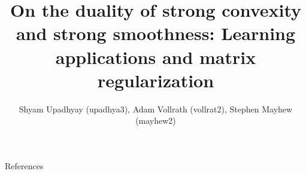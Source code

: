 \documentclass[11pt]{beamer}
\author{Shyam Upadhyay (upadhya3), Adam Vollrath (vollrat2), Stephen Mayhew (mayhew2)}
\title{On the duality of strong convexity and strong smoothness: Learning applications and matrix regularization}
\begin{document}
{\nologo
\begin{frame}
\titlepage
\end{frame}
}








\begin{frame}[allowframebreaks]{References}
  \def\newblock{}
  
  
\end{frame}
\end{document}
